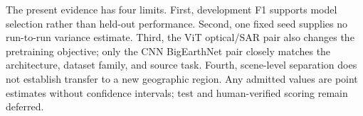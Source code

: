 \documentclass[runningheads]{vendor/llncs}
\begin{document}
The present evidence has four limits. First, development F1 supports model
selection rather than held-out performance. Second, one fixed seed supplies no
run-to-run variance estimate. Third, the ViT optical/SAR pair also changes the
pretraining objective; only the CNN BigEarthNet pair closely matches the
architecture, dataset family, and source task. Fourth, scene-level separation
does not establish transfer to a new geographic region. Any admitted values are
point estimates without confidence intervals; test and human-verified scoring remain deferred.

\clearpage


\clearpage
\appendix

\end{document}
